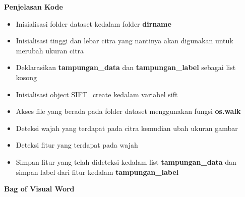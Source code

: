 \documentclass[
  letterpaper,
  DIV=11,
  numbers=noendperiod]{scrreprt}
\providecommand{\tightlist}{%
  \setlength{\itemsep}{0pt}\setlength{\parskip}{0pt}}\usepackage{longtable,booktabs,array}
\begin{document}
\begin{tcolorbox}[enhanced jigsaw, opacityback=0, colbacktitle=quarto-callout-tip-color!10!white, breakable, titlerule=0mm, left=2mm, toptitle=1mm, rightrule=.15mm, leftrule=.75mm, colback=white, opacitybacktitle=0.6, arc=.35mm, toprule=.15mm, coltitle=black, colframe=quarto-callout-tip-color-frame, bottomtitle=1mm, title=\textcolor{quarto-callout-tip-color}{\faLightbulb}\hspace{0.5em}{Tip}, bottomrule=.15mm]

\textbf{Penjelasan Kode}

\begin{itemize}
\tightlist
\item
  Inisialisasi folder dataset kedalam folder \textbf{dirname}\\
\item
  Inisialisasi tinggi dan lebar citra yang nantinya akan digunakan untuk
  merubah ukuran citra\\
\item
  Deklarasikan \textbf{tampungan\_data} dan \textbf{tampungan\_label}
  sebagai list kosong\\
\item
  Inisialisasi object SIFT\_create kedalam variabel sift
\item
  Akses file yang berada pada folder dataset menggunakan fungsi
  \textbf{os.walk}\\
\item
  Deteksi wajah yang terdapat pada citra kemudian ubah ukuran gambar\\
\item
  Deteksi fitur yang terdapat pada wajah
\item
  Simpan fitur yang telah dideteksi kedalam list
  \textbf{tampungan\_data} dan simpan label dari fitur kedalam
  \textbf{tampungan\_label}
\end{itemize}

\end{tcolorbox}

\textbf{Bag of Visual Word}
\end{document}
